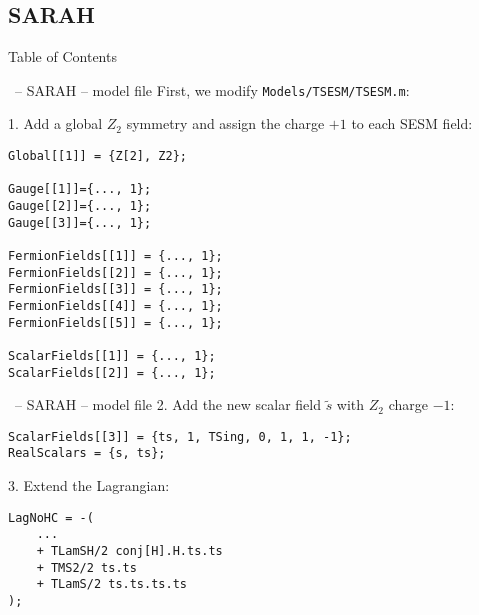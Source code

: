 \documentclass[11pt]{beamer}
\begin{document}

\subsection{SARAH}


\begin{frame}{Table of Contents}
\end{frame}


\begin{frame}[fragile]{\insertsection\ -- SARAH -- model file}
  First, we modify \texttt{Models/TSESM/TSESM.m}:

  \medskip

  1. Add a global $Z_2$ symmetry and assign the charge $+1$ to each SESM
  field:
  \begin{lstlisting}
Global[[1]] = {Z[2], Z2};

Gauge[[1]]={..., 1};
Gauge[[2]]={..., 1};
Gauge[[3]]={..., 1};

FermionFields[[1]] = {..., 1};
FermionFields[[2]] = {..., 1};
FermionFields[[3]] = {..., 1};
FermionFields[[4]] = {..., 1};
FermionFields[[5]] = {..., 1};

ScalarFields[[1]] = {..., 1};
ScalarFields[[2]] = {..., 1};\end{lstlisting}
\end{frame}


\begin{frame}[fragile]{\insertsection\ -- SARAH -- model file}
  2. Add the new scalar field $\tilde{s}$ with $Z_2$ charge $-1$:
  \begin{lstlisting}
ScalarFields[[3]] = {ts, 1, TSing, 0, 1, 1, -1};
RealScalars = {s, ts};\end{lstlisting}
  3. Extend the Lagrangian:
  \begin{lstlisting}
LagNoHC = -(
    ...
    + TLamSH/2 conj[H].H.ts.ts
    + TMS2/2 ts.ts
    + TLamS/2 ts.ts.ts.ts
);\end{lstlisting}
\end{frame}

\end{document}
